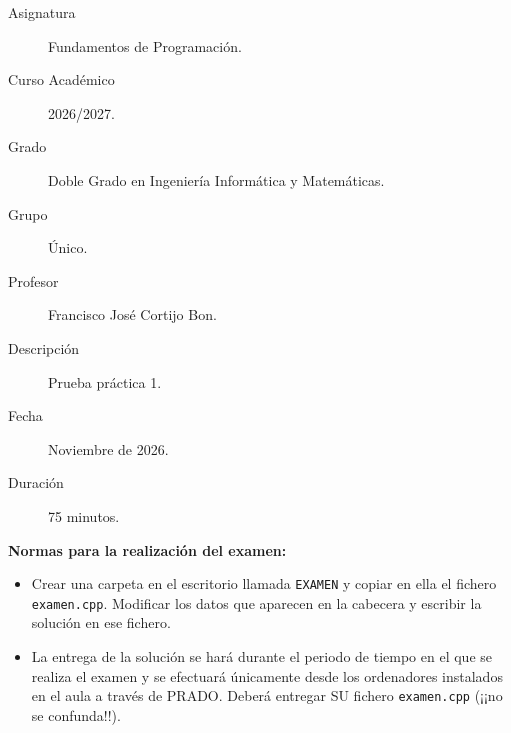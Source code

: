 \documentclass[12pt]{article}
\begin{document}

    
    

    \begin{description}
        \item[Asignatura] Fundamentos de Programación.
        \item[Curso Académico] 2026/2027.
        \item[Grado] Doble Grado en Ingeniería Informática y Matemáticas.
        \item[Grupo] Único.
        \item[Profesor] Francisco José Cortijo Bon.
        \item[Descripción] Prueba práctica 1.
        \item[Fecha] Noviembre de 2026.
        \item[Duración] 75 minutos.
    \end{description}
    \newpage


    
    \noindent\textbf{Normas para la realización del examen:}
    \begin{itemize}
        \item Crear una carpeta en el escritorio llamada \texttt{EXAMEN} y copiar en ella el fichero \texttt{examen.cpp}. Modificar los datos que aparecen en la cabecera y escribir la solución en ese fichero.
        \item La entrega de la solución se hará durante el periodo de tiempo en el que se realiza el examen y se efectuará únicamente desde los ordenadores instalados en el aula a través de PRADO. Deberá entregar SU fichero \texttt{examen.cpp} (¡¡no se confunda!!).
    \end{itemize}

    \vspace{0.5cm}
\end{document}
